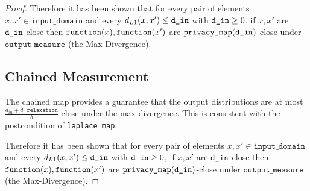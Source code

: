 \documentclass{article}
\begin{document}
\begin{proof}
Therefore it has been shown that for every pair of elements $x, x' \in \texttt{input\_domain}$ and every $d_{L1}(x, x') \le \texttt{d\_in}$ with $\texttt{d\_in} \ge 0$, 
if $x, x'$ are $\texttt{d\_in}$-close then $\texttt{function}(x),\texttt{function}(x')$ are $\texttt{privacy\_map}(\texttt{d\_in})$-close under $\texttt{output\_measure}$ (the Max-Divergence).

\subsection{Chained Measurement}
The chained map provides a guarantee that the output distributions are at most $\frac{d_{in} + d \cdot \texttt{relaxation}}{b}$-close under the max-divergence.
This is consistent with the postcondition of \texttt{laplace\_map}.

Therefore it has been shown that for every pair of elements $x, x' \in \texttt{input\_domain}$ and every $d_{L1}(x, x') \le \texttt{d\_in}$ with $\texttt{d\_in} \ge 0$, 
if $x, x'$ are $\texttt{d\_in}$-close then $\texttt{function}(x), \texttt{function}(x')$ are $\texttt{privacy\_map}(\texttt{d\_in})$-close under $\texttt{output\_measure}$ (the Max-Divergence).

\end{proof}
\end{document}
